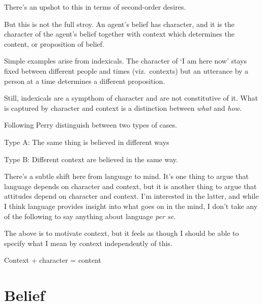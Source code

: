 \documentclass[10pt]{article}
\begin{document}
There's an upshot to this in terms of second-order desires.





But this is not the full stroy.
An agent's belief has character, and it is the character of the agent's belief together with context which determines the content, or proposition of belief.

Simple examples arise from indexicals.
The character of `I am here now' stays fixed between different people and times (viz.\ contexts) but an utterance by a person at a time determines a different proposition.

Still, indexicals are a sympthom of character and are not constitutive of it.
What is captured by character and context is a distinction between \emph{what} and \emph{how}.

Following Perry distinguish between two types of cases.

Type A: The same thing is believed in different ways

Type B: Different context are believed in the same way.

There's a subtle shift here from language to mind.
It's one thing to argue that language depends on character and context, but it is another thing to argue that attitudes depend on character and context.
I'm interested in the latter, and while I think language provides insight into what goes on in the mind, I don't take any of the following to say anything about language \emph{per se}.

The above is to motivate context, but it feels as though I should be able to specify what I mean by context independently of this.



Context + character = content


\section{Belief}
\label{sec:belief}
\end{document}
